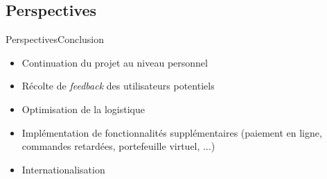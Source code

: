 \documentclass[usenames,dvipsnames]{beamer}
\begin{document}
\subsection{Perspectives}
\begin{frame}{Perspectives}{Conclusion}
  \begin{itemize}
    \item Continuation du projet au niveau personnel
    \item Récolte de \textit{feedback} des utilisateurs potentiels
    \item Optimisation de la logistique
    \item Implémentation de fonctionnalités supplémentaires (paiement en ligne, commandes retardées, portefeuille virtuel, $\dots$)
    \item Internationalisation
 \end{itemize}
\end{frame}
\end{document}
